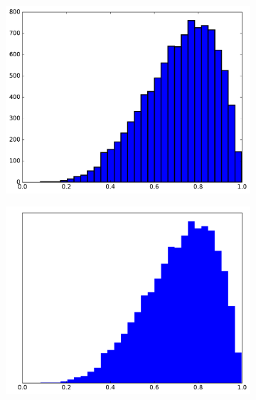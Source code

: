 \begin{figure}[H] %
\centering
\begin{subfigure}{.325\textwidth}
    \centering
    \includegraphics[width=\linewidth]{figures/histogram_2.pdf}
\end{subfigure}
%
\begin{subfigure}{.325\textwidth}
    \centering
    \includegraphics[width=\linewidth]{figures/histogram_3.pdf}
\end{subfigure}
%
\begin{subfigure}{.325\textwidth}
    \centering

\end{subfigure}
\end{figure}
